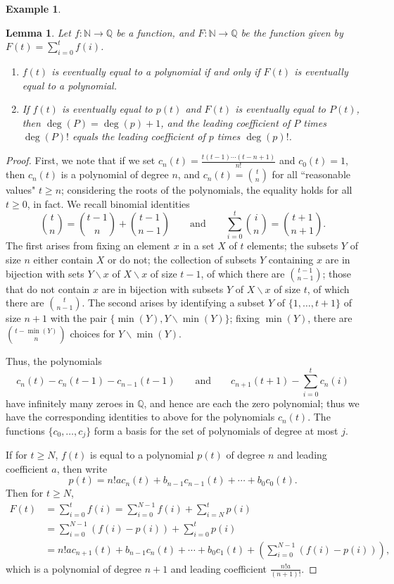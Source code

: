 \documentclass{amsart}[12pt]
\newcommand{\Q}{\mathbb{Q}}
\newcommand{\N}{\mathbb{N}}
\numberwithin{equation}{section}
\theoremstyle{plain} %
\newtheorem{lemma}[equation]{Lemma}
\theoremstyle{definition}
\newtheorem{ex}[equation]{Example}
\theoremstyle{remark}
\begin{document}
\begin{ex}
\begin{lemma} Let $f:\N \to \Q$ be a function, and $F:\N \to \Q$ be the function given by $F(t) = \sum_{i=0}^t f(i)$. 
\begin{enumerate}
\item $f(t)$ is eventually equal to a polynomial if and only if $F(t)$ is eventually equal to a polynomial.
\item If $f(t)$ is eventually equal to $p(t)$ and $F(t)$ is eventually equal to $P(t)$, then $\deg(P) = \deg(p)+1$, and the leading coefficient of $P$ times $\deg(P)!$  equals the leading coefficient of $p$ times $\deg(p)!$.
\end{enumerate}
\end{lemma}
\begin{proof}
 First, we note that if we set $c_n(t)= \displaystyle  \frac{t (t-1) \cdots (t-n+1)}{n!}$ and $c_0(t) =1$, then $c_n(t)$ is a polynomial of degree $n$, and $c_n(t) = \displaystyle \binom{t}{n}$ for all ``reasonable values" $t\geq n$; considering the roots of the polynomials, the equality holds for all $t\geq 0$, in fact.  We recall binomial identities
 \[ \binom{t}{n} = \binom{t-1}{n} + \binom{t-1}{n-1}\qquad \text{and} \qquad  \sum_{i=0}^t \binom{i}{n} = \binom{t+1}{n+1}.\]
 The first arises from fixing an element $x$ in a set $X$ of $t$ elements; the subsets $Y$ of size $n$ either contain $X$ or do not; the collection of subsets $Y$ containing $x$ are in bijection with sets $Y\smallsetminus x$ of $X\smallsetminus x$ of size $t-1$, of which there are $\binom{t-1}{n-1}$; those that do not contain $x$ are in bijection with subsets $Y$ of $X\smallsetminus x$ of size $t$, of which there are $\binom{t}{n-1}$. The second arises by identifying a subset $Y$ of $\{1,\dots, t+1\}$ of size $n+1$ with the pair $\{ \min(Y) , Y\smallsetminus \min(Y)\}$; fixing $\min(Y)$, there are $\displaystyle \binom{t-\min(Y)}{n}$ choices for $Y\smallsetminus \min(Y)$.
 
Thus, the polynomials
\[ c_n(t) - c_n(t-1) - c_{n-1}(t-1) \qquad \text{and} \qquad c_{n+1}(t+1) -  \sum_{i=0}^t c_n(i)\]
have infinitely many zeroes in $\Q$, and hence are each the zero polynomial; thus we have the corresponding identities to above for the polynomials $c_n(t)$. The functions $\{c_0,\dots,c_j\}$ form a basis for the set of polynomials of degree at most $j$.
 
If for $t\geq N$, $f(t)$ is equal to a polynomial $p(t)$ of degree $n$ and leading coefficient $a$, then write \[p(t) = n! a c_n(t) + b_{n-1} c_{n-1}(t) + \cdots + b_0 c_0(t).\]
 Then for $t\geq N$,
 \[ \begin{aligned} F(t) &= \sum_{i=0}^t f(i) = \sum_{i=0}^{N-1} f(i) + \sum_{i=N}^{t} p(i) \\ &= \sum_{i=0}^{N-1} (f(i) -p(i))+ \sum_{i=0}^{t} p(i) \\&=  n! a c_{n+1}(t) + b_{n-1} c_{n}(t) + \cdots + b_0 c_1(t) + \left( \sum_{i=0}^{N-1} (f(i) -p(i)) \right),\end{aligned}\]
 which is a polynomial of degree $n+1$ and leading coefficient $\displaystyle \frac{n! a}{(n+1)!}$.
 

\end{proof}
\end{ex}
\end{document}
